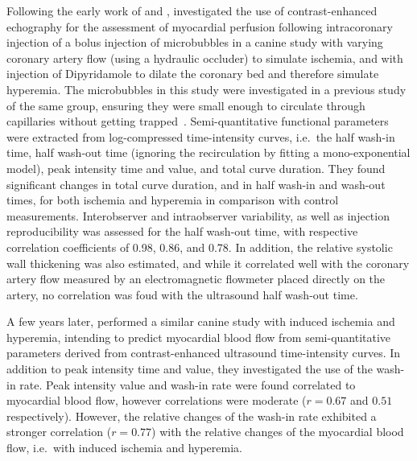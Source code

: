 Following the early work of \citet{Armstrong:1982tq} and \citet{Tei:1983ul}, \citet{TenCate:1984hl} investigated the use of contrast-enhanced echography for the assessment of myocardial perfusion following intracoronary injection of a bolus injection of microbubbles in a canine study with varying coronary artery flow (using a hydraulic occluder) to simulate ischemia, and with injection of Dipyridamole to dilate the coronary bed and therefore simulate hyperemia.
The microbubbles in this study were investigated in a previous study of the same group, ensuring they were small enough to circulate through capillaries without getting trapped~\cite{Feinstein:1984gk}. 
Semi-quantitative functional parameters were extracted from log-compressed time-intensity curves, i.e.~the half wash-in time, half wash-out time (ignoring the recirculation by fitting a mono-exponential model), peak intensity time and value, and total curve duration.
They found significant changes in total curve duration, and in half wash-in and wash-out times, for both ischemia and hyperemia in comparison with control measurements.
Interobserver and intraobserver variability, as well as injection reproducibility was assessed for the half wash-out time, with respective correlation coefficients of 0.98, 0.86, and 0.78.
In addition, the relative systolic wall thickening was also estimated, and while it correlated well with the coronary artery flow measured by an electromagnetic flowmeter placed directly on the artery, no correlation was foud with the ultrasound half wash-out time. 

A few years later, \citet{Vandenberg:1989bza} performed a similar canine study with induced ischemia and hyperemia, intending to predict myocardial blood flow from semi-quantitative parameters derived from contrast-enhanced ultrasound time-intensity curves. 
In addition to peak intensity time and value, they investigated the use of the wash-in rate. 
Peak intensity value and wash-in rate were found correlated to myocardial blood flow, however correlations were moderate ($r = 0.67$ and $0.51$ respectively).
However, the relative changes of the wash-in rate exhibited a stronger correlation ($r = 0.77$) with the relative changes of the myocardial blood flow, i.e.~with induced ischemia and hyperemia.

